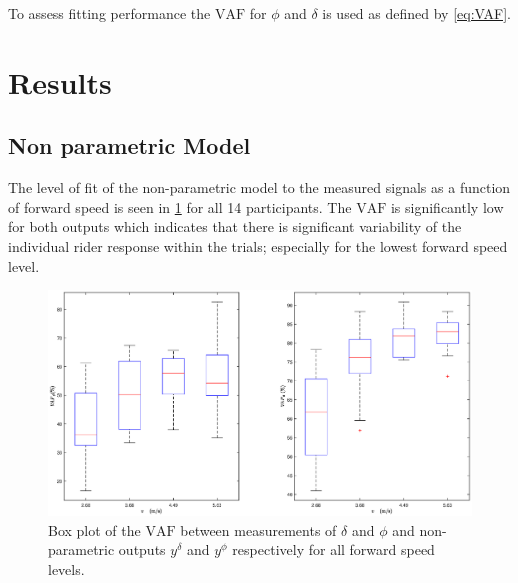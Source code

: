 To assess fitting performance the \ensuremath{\mathrm{VAF}} for \ensuremath{\phi} and \ensuremath{\delta} is used as defined by \cref{eq:VAF}.
\section{Results}
\subsection{Non parametric Model}
The level of fit of the non-parametric model to the measured signals as a function of forward speed is seen in \cref{fig:FIT_FIR} for all 14 participants. The \ensuremath{\mathrm{VAF}} is significantly low for both outputs which indicates that there is significant variability of the individual rider response within the trials; especially for the lowest forward speed level. 
\begin{figure}[h!]
    \centering

    \includegraphics[width=\linewidth]{images/steer_irf/FIT_irf_steer.eps}
    \caption{Box plot of the  \ensuremath{\mathrm{VAF}} between measurements of \ensuremath{\delta} and \ensuremath{\phi} and non-parametric outputs \ensuremath{y^\delta} and \ensuremath{y^\phi} respectively for all forward speed levels.}
    \label{fig:FIT_FIR}
\end{figure}

